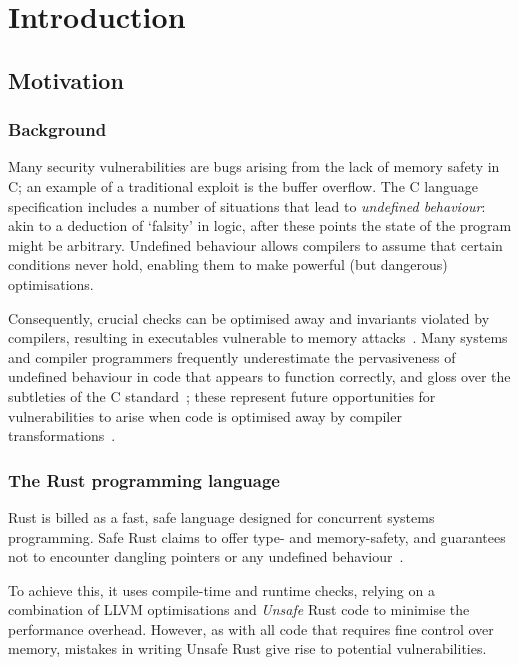 \documentclass[dissertation.tex]{subfiles}
\begin{document}
\chapter{Introduction}
\label{ch:intro}

\section{Motivation}
\label{sec:intro-motiv}

\subsection{Background}
Many security vulnerabilities are bugs arising from the lack of memory safety in C; an example of a traditional exploit is the buffer overflow.
The C language specification includes a number of situations that lead to \emph{undefined behaviour}: akin to a deduction of `falsity' in logic, after these points the state of the program might be arbitrary.
Undefined behaviour allows compilers to assume that certain conditions never hold, enabling them to make powerful (but dangerous) optimisations.

Consequently, crucial checks can be optimised away and invariants violated by compilers, resulting in executables vulnerable to memory attacks~\cite{simon2018wygiwyc}.
Many systems and compiler programmers frequently underestimate the pervasiveness of undefined behaviour in code that appears to function correctly, and gloss over the subtleties of the C standard~\cite{memarian2016cdepths};
these represent future opportunities for vulnerabilities to arise when code is optimised away by compiler transformations~\cite{wang2013towards}.



\subsection{The Rust programming language}


Rust is billed as a fast, safe language designed for concurrent systems
programming.
Safe Rust claims to offer type- and memory-safety, and guarantees not to
encounter dangling pointers or any undefined
behaviour~\cite{rust-nomicon-safe-unsafe}.

To achieve this, it uses compile-time and runtime checks, relying on a
combination of LLVM optimisations and \emph{Unsafe} Rust code to
minimise the performance overhead.
However, as with all code that requires fine control over memory,
mistakes in writing Unsafe Rust give rise to potential vulnerabilities.
\end{document}

